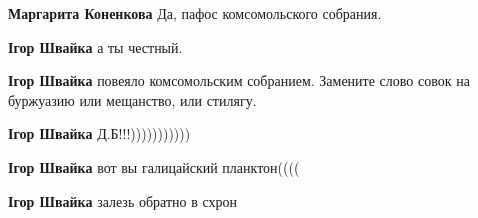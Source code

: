 \begin{itemize}
\begin{itemize}
 
\textbf{Маргарита Коненкова} Да, пафос комсомольского собрания.

 
\textbf{Ігор Швайка} а ты честный.

 
\textbf{Ігор Швайка} повеяло комсомольским собранием. Замените слово совок на буржуазию или мещанство, или стилягу.

 
\textbf{Ігор Швайка} Д.Б!!!)))))))))))

 
\textbf{Ігор Швайка} вот вы галицайский планктон((((

 
\textbf{Ігор Швайка} залезь обратно в схрон

 

\end{itemize}
\end{itemize}

